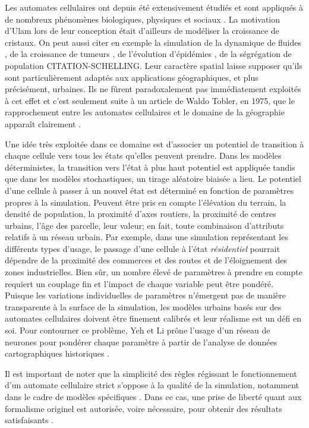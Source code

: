 \documentclass[10pt]{article}
\begin{document}
\begin{multicols}{2}
Les automates cellulaires ont depuis été extensivement étudiés et sont
appliqués à de nombreux phénomènes biologiques, physiques et sociaux
\cite{Ganguly}. La motivation d'Ulam lors de leur conception était
d'ailleurs de modéliser la croissance de cristaux. On peut aussi citer
en exemple la simulation de la dynamique de fluides \cite{Frisch1986},
de la croissance de tumeurs \cite{Kansal2000}, de l'évolution
d'épidémies \cite{Fu2003}, de la ségrégation de population
CITATION-SCHELLING. Leur caractère spatial laisse supposer qu'ils sont
particulièrement adaptés aux applications géographiques, et plus
précisément, urbaines. Ils ne fûrent paradoxalement pas immédiatement
exploités à cet effet et c'est seulement suite à un article de Waldo
Tobler, en 1975, que le rapprochement entre les automates cellulaires
et le domaine de la géographie apparaît clairement \cite{Tobler1975}.

Une idée très exploitée dans ce domaine est d'associer un potentiel de
transition à chaque cellule vers tous les états qu'elles peuvent
prendre. Dans les modèles déterministes, la transition vers l'état à
plus haut potentiel est appliquée tandis que dans les modèles
stochastiques, un tirage aléatoire biaisée a lieu. Le potentiel d'une
cellule à passer à un nouvel état est déterminé en fonction de
paramètres propres à la simulation. Peuvent être pris en compte
l'élévation du terrain, la densité de population, la proximité d'axes
routiers, la proximité de centres urbains, l'âge des parcelle, leur
valeur; en fait, toute combinaison d'attributs relatifs à un réseau
urbain. Par exemple, dans une simulation représentant les différents
types d'usage, le passage d'une cellule à l'état \textit{résidentiel}
pourrait dépendre de la proximité des commerces et des routes et de
l'éloignement des zones industrielles. Bien sûr, un nombre élevé de
paramètres à prendre en compte requiert un couplage fin et l'impact de
chaque variable peut être pondéré. Puisque les variations
individuelles de paramètres n'émergent pas de manière transparente à
la surface de la simulation, les modèles urbains basés sur des
automates cellulaires doivent être finement calibrés et leur réalisme
est un défi en soi. Pour contourner ce problème, Yeh et Li prône
l'usage d'un réseau de neurones pour pondérer chaque paramètre à
partir de l'analyse de données cartographiques historiques
\cite{Yeh2002}.

Il est important de noter que la simplicité des règles régissant le
fonctionnement d'un automate cellulaire strict s'oppose à la qualité
de la simulation, notamment dans le cadre de modèles spécifiques
\cite{Torrens2001}. Dans ce cas, une prise de liberté quant aux
formalisme originel est autorisée, voire nécessaire, pour obtenir des
résultats satisfaisants \cite{White1998}.


\end{multicols}
\end{document}
